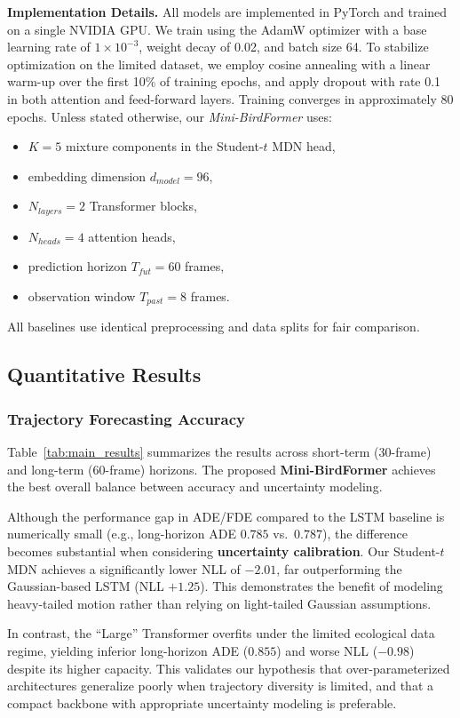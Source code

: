 \documentclass[journal]{IEEEtran}
\begin{document}
\textbf{Implementation Details.}
All models are implemented in PyTorch and trained on a single NVIDIA GPU. We train using the AdamW optimizer with a base learning rate of $1\times10^{-3}$, weight decay of 0.02, and batch size 64. To stabilize optimization on the limited dataset, we employ cosine annealing with a linear warm-up over the first 10\% of training epochs, and apply dropout with rate 0.1 in both attention and feed-forward layers. Training converges in approximately 80 epochs. Unless stated otherwise, our \textit{Mini-BirdFormer} uses:
\begin{itemize}
	\item $K=5$ mixture components in the Student-$t$ MDN head,
	\item embedding dimension $d_{model}=96$,
	\item $N_{layers}=2$ Transformer blocks,
	\item $N_{heads}=4$ attention heads,
	\item prediction horizon $T_{fut}=60$ frames,
	\item observation window $T_{past}=8$ frames.
\end{itemize}
All baselines use identical preprocessing and data splits for fair comparison.

\subsection{Quantitative Results}

\subsubsection{Trajectory Forecasting Accuracy}

Table~\ref{tab:main_results} summarizes the results across short-term (30-frame) and long-term (60-frame) horizons. The proposed \textbf{Mini-BirdFormer} achieves the best overall balance between accuracy and uncertainty modeling.

Although the performance gap in ADE/FDE compared to the LSTM baseline is numerically small (e.g., long-horizon ADE $0.785$ vs.\ $0.787$), the difference becomes substantial when considering \textbf{uncertainty calibration}. Our Student-$t$ MDN achieves a significantly lower NLL of \textbf{$-2.01$}, far outperforming the Gaussian-based LSTM (NLL $+1.25$). This demonstrates the benefit of modeling heavy-tailed motion rather than relying on light-tailed Gaussian assumptions.

In contrast, the ``Large'' Transformer overfits under the limited ecological data regime, yielding inferior long-horizon ADE ($0.855$) and worse NLL ($-0.98$) despite its higher capacity. This validates our hypothesis that over-parameterized architectures generalize poorly when trajectory diversity is limited, and that a compact backbone with appropriate uncertainty modeling is preferable.
\end{document}
